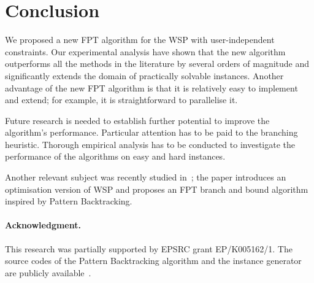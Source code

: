 \documentclass[runningheads,proof]{llncs}
\begin{document}
\section{Conclusion}
\label{sec:conclusion}

We proposed a new FPT algorithm for the WSP with user-independent constraints.  
Our experimental analysis have shown that the new algorithm outperforms all the methods in the literature by several orders of magnitude and significantly extends the domain of practically solvable instances.
Another advantage of the new FPT algorithm is that it is relatively easy to implement and extend; for example, it is straightforward to parallelise it.

Future research is needed to establish further potential to improve the algorithm's performance.
Particular attention has to be paid to the branching heuristic.
Thorough empirical analysis has to be conducted to investigate the performance of the algorithms on easy and hard instances.

Another relevant subject was recently studied in~\cite{ValuedWSP-SACMAT}; the paper introduces an optimisation version of WSP and proposes an FPT branch and bound algorithm inspired by Pattern Backtracking.


\paragraph{Acknowledgment.}
This research was partially supported by EPSRC grant EP/\linebreak[1]K005162/1.
The source codes of the Pattern Backtracking algorithm and the instance generator are publicly available~\cite{SourceCodes}.
\end{document}
